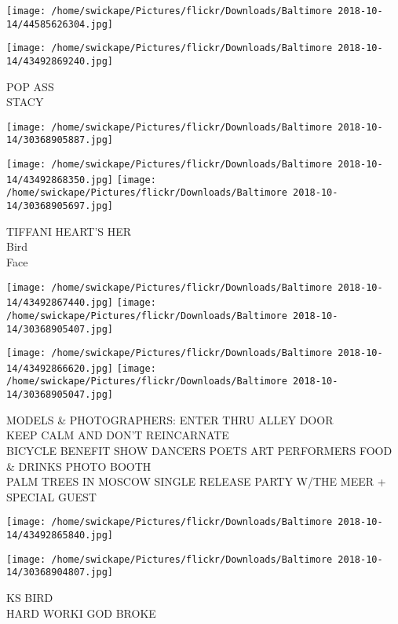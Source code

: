 \documentclass[10pt,letterpaper]{article}
\begin{document}
\texttt{[image: /home/swickape/Pictures/flickr/Downloads/Baltimore 2018-10-14/44585626304.jpg]}

\vspace{0.25in}
\texttt{[image: /home/swickape/Pictures/flickr/Downloads/Baltimore 2018-10-14/43492869240.jpg]}

POP ASS\\
STACY\\
\pagebreak

\texttt{[image: /home/swickape/Pictures/flickr/Downloads/Baltimore 2018-10-14/30368905887.jpg]}

\vspace{0.25in}
\texttt{[image: /home/swickape/Pictures/flickr/Downloads/Baltimore 2018-10-14/43492868350.jpg]}
\texttt{[image: /home/swickape/Pictures/flickr/Downloads/Baltimore 2018-10-14/30368905697.jpg]}

TIFFANI HEART'S HER\\
Bird\\
Face\\
\pagebreak

\texttt{[image: /home/swickape/Pictures/flickr/Downloads/Baltimore 2018-10-14/43492867440.jpg]}
\texttt{[image: /home/swickape/Pictures/flickr/Downloads/Baltimore 2018-10-14/30368905407.jpg]}

\texttt{[image: /home/swickape/Pictures/flickr/Downloads/Baltimore 2018-10-14/43492866620.jpg]}
\texttt{[image: /home/swickape/Pictures/flickr/Downloads/Baltimore 2018-10-14/30368905047.jpg]}

MODELS \& PHOTOGRAPHERS: ENTER THRU ALLEY DOOR\\
KEEP CALM AND DON'T REINCARNATE\\
BICYCLE BENEFIT SHOW DANCERS POETS ART PERFORMERS FOOD \& DRINKS PHOTO BOOTH\\
PALM TREES IN MOSCOW SINGLE RELEASE PARTY W/THE MEER + SPECIAL GUEST\\
\pagebreak

\texttt{[image: /home/swickape/Pictures/flickr/Downloads/Baltimore 2018-10-14/43492865840.jpg]}

\vspace{0.25in}
\texttt{[image: /home/swickape/Pictures/flickr/Downloads/Baltimore 2018-10-14/30368904807.jpg]}

KS BIRD\\
HARD WORKI GOD BROKE\\
\pagebreak
\end{document}
